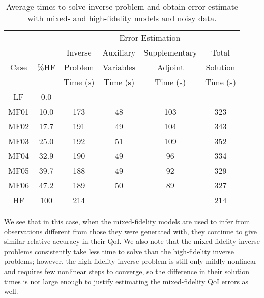 \begin{table}
\caption{Average times to solve inverse problem and obtain error estimate with mixed- and high-fidelity models and noisy data.}
\label{tab:ref3D_newdata_times}
\centering
\begin{tabular}{ccc|c|c|c}
\cline{4-5} 
 & & & \multicolumn{2}{|c|}{Error Estimation} & \\
\cline{1-6}
\multicolumn{1}{|c|}{\multirow{3}{*}{Case}} & \multicolumn{1}{|c|}{\multirow{3}{*}{$\%$HF}} & Inverse & Auxiliary & Supplementary & \multicolumn{1}{|c|}{Total} \\
\multicolumn{1}{|c|}{} & \multicolumn{1}{|c|}{} & Problem & Variables & Adjoint & \multicolumn{1}{|c|}{Solution}\\
\multicolumn{1}{|c|}{} & \multicolumn{1}{|c|}{} & Time (s) &  Time (s) & Time (s) & \multicolumn{1}{|c|}{Time (s)}\\
\cline{1-6}
\multicolumn{1}{|c|}{LF}    & \multicolumn{1}{|c|}{0.0}   &  &  &  & \multicolumn{1}{|c|}{} \\ \hline
\multicolumn{1}{|c|}{MF01}  & \multicolumn{1}{|c|}{10.0}  & 173 & 48 & 103 & \multicolumn{1}{|c|}{323} \\ \hline
\multicolumn{1}{|c|}{MF02}  & \multicolumn{1}{|c|}{17.7}  & 191 & 49 & 104 & \multicolumn{1}{|c|}{343} \\ \hline
\multicolumn{1}{|c|}{MF03}  & \multicolumn{1}{|c|}{25.0}  & 192 & 51 & 109 & \multicolumn{1}{|c|}{352} \\ \hline
\multicolumn{1}{|c|}{MF04}  & \multicolumn{1}{|c|}{32.9}  & 190 & 49 & 96  & \multicolumn{1}{|c|}{334} \\ \hline
\multicolumn{1}{|c|}{MF05}  & \multicolumn{1}{|c|}{39.7}  & 188 & 49 & 92  & \multicolumn{1}{|c|}{329} \\ \hline
\multicolumn{1}{|c|}{MF06}  & \multicolumn{1}{|c|}{47.2}  & 189 & 50 & 89  & \multicolumn{1}{|c|}{327} \\ \hline
\multicolumn{1}{|c|}{HF}    & \multicolumn{1}{|c|}{100}   & 214 & -- & --  & \multicolumn{1}{|c|}{214} \\ \hline
\end{tabular}
\end{table}
%

We see that in this case, when the mixed-fidelity models are used to infer from observations different from those they were generated with, they continue to give similar relative accuracy in their QoI. We also note that the mixed-fidelity inverse problems consistently take less time to solve than the high-fidelity inverse problems; however, the high-fidelity inverse problem is still only mildly nonlinear and requires few nonlinear steps to converge, so the difference in their solution times is not large enough to justify estimating the mixed-fidelity QoI errors as well.

